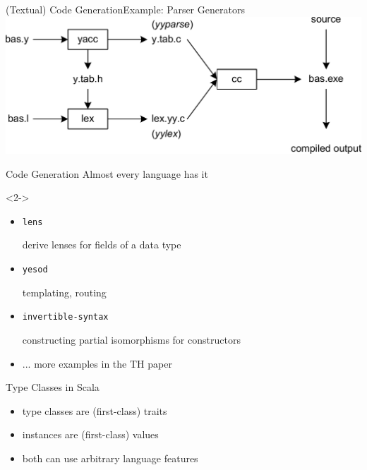\documentclass{beamer}
\begin{document}
\begin{frame}
\vskip40pt
\begin{center}
\end{center}
\end{frame}

\begin{frame}[fragile]{(Textual) Code Generation}{Example: Parser Generators}
  \includegraphics[width=\linewidth]{img/yacc.png}
\end{frame}

\begin{frame}{Code Generation}
  Almost every language has it

  \begin{visibleenv}<2->
    \begin{itemize}
      \item \texttt{lens}

         derive lenses for fields of a data type
      \item \texttt{yesod}

        templating, routing
      \item \texttt{invertible-syntax}

        constructing partial isomorphisms for constructors

      \item ... more examples in the TH paper
    \end{itemize}
  \end{visibleenv}
\end{frame}

\begin{frame}{Type Classes in Scala}
  \begin{itemize}
    \item type classes are (first-class) traits
    \item instances are (first-class) values
    \item<visible@2> both can use arbitrary language features
  \end{itemize}
\end{frame}
\end{document}
